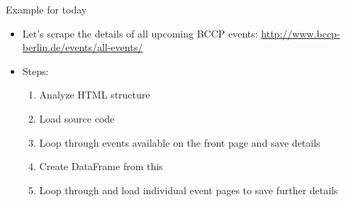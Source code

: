 \begin{frame}{Example for today}
\begin{itemize}
	\item Let's scrape the details of all upcoming BCCP events: \url{http://www.bccp-berlin.de/events/all-events/}
	\item Steps:
		\begin{enumerate}
			\item Analyze HTML structure
			\item Load source code
			\item Loop through events available on the front page and save details
			\item Create DataFrame from this
			\item Loop through and load individual event pages to save further details
		\end{enumerate}
\end{itemize}
\end{frame}


